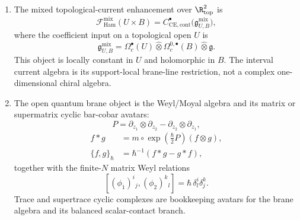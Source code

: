 \begin{stmt}
\begin{enumerate}[label=(\arabic*)]
    \item The mixed topological-current enhancement over
      \(\R^2_{\mathrm{top}}\) is
      \[
        \mathcal F_{\mathrm{Ham}}^{\mathrm{mix}}(U\times B)
        =
        C^\bullet_{\mathrm{CE},\mathrm{cont}}
        \bigl(\mathfrak g^{\mathrm{mix}}_{U,B}\bigr),
      \]
      where the coefficient input on a topological open \(U\) is
      \[
        \mathfrak g^{\mathrm{mix}}_{U,B}
        =
        \Omega^\bullet_c(U)\widehat\otimes
        \Omega^{0,\bullet}_c(B)\widehat\otimes\mathfrak g .
      \]
      This object is locally constant in \(U\) and holomorphic in \(B\).
      The interval current algebra is its support-local brane-line
      restriction, not a complex one-dimensional chiral algebra.

    \item The open quantum brane object is the Weyl/Moyal algebra and its
      matrix or supermatrix cyclic bar-cobar avatars:
      \[
        P=\partial_{z_1}\otimes\partial_{z_2}
        -\partial_{z_2}\otimes\partial_{z_1},
      \]
      \[
        \begin{aligned}
        f*g&=m\circ\exp\!\left(\frac{\hbar}{2}P\right)(f\otimes g),\\
        \{f,g\}_\hbar&=\hbar^{-1}(f*g-g*f),
        \end{aligned}
      \]
      together with the finite-\(N\) matrix Weyl relations
      \[
        [(\phi_1)^i{}_j,(\phi_2)^k{}_l]
        =\hbar\,\delta^i_l\delta^k_j .
      \]
      Trace and supertrace cyclic complexes are bookkeeping avatars for
      the brane algebra and its balanced scalar-contact branch.


\end{enumerate}
\end{stmt}
